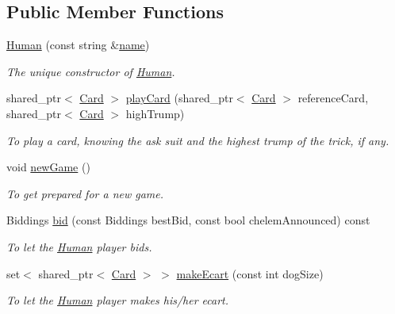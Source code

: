\subsection*{Public Member Functions}
\begin{DoxyCompactItemize}
\item 
\hyperlink{classHuman_abfd57b90d90f9222384c76b44346ba7b}{Human} (const string \&\hyperlink{classPlayer_acf0355128a99ee20ad9931b760fb2de1}{name})
\begin{DoxyCompactList}\small\item\em The unique constructor of \hyperlink{classHuman}{Human}. \end{DoxyCompactList}\item 
shared\-\_\-ptr$<$ \hyperlink{classCard}{Card} $>$ \hyperlink{classHuman_a3258d3ce0eec7a5e393c639506ef28e5}{play\-Card} (shared\-\_\-ptr$<$ \hyperlink{classCard}{Card} $>$ reference\-Card, shared\-\_\-ptr$<$ \hyperlink{classCard}{Card} $>$ high\-Trump)
\begin{DoxyCompactList}\small\item\em To play a card, knowing the ask suit and the highest trump of the trick, if any. \end{DoxyCompactList}\item 
\hypertarget{classHuman_aae5efb6945fdbcda9c9a4d9e72d4a60e}{void \hyperlink{classHuman_aae5efb6945fdbcda9c9a4d9e72d4a60e}{new\-Game} ()}\label{classHuman_aae5efb6945fdbcda9c9a4d9e72d4a60e}

\begin{DoxyCompactList}\small\item\em To get prepared for a new game. \end{DoxyCompactList}\item 
Biddings \hyperlink{classHuman_a424bc9179b7036f22a694329b5f6fedf}{bid} (const Biddings best\-Bid, const bool chelem\-Announced) const 
\begin{DoxyCompactList}\small\item\em To let the \hyperlink{classHuman}{Human} player bids. \end{DoxyCompactList}\item 
set$<$ shared\-\_\-ptr$<$ \hyperlink{classCard}{Card} $>$ $>$ \hyperlink{classHuman_a02cdef89dde0adcb554f081e81f97896}{make\-Ecart} (const int dog\-Size)
\begin{DoxyCompactList}\small\item\em To let the \hyperlink{classHuman}{Human} player makes his/her ecart. \end{DoxyCompactList}\end{DoxyCompactItemize}
